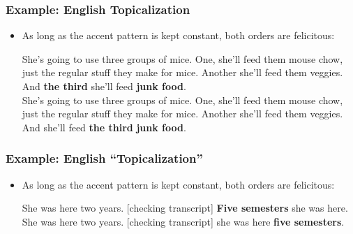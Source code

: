 \documentclass[hyperref={pdfpagelabels=false}]{beamer}
\begin{document}
\begin{frame}
\frametitle{Example: English Topicalization}
\begin{itemize}
	\item As long as the accent pattern is kept constant, both orders are felicitous:
	
	\begin{exe}
\ex \label{princetop1} She's going to use three groups of mice.
One, she'll feed them mouse chow, just the regular stuff they make for
mice.
Another she'll feed them veggies.
And \textbf{the third} she'll feed \textbf{junk food}.\\

\ex \label{untop1} She's going to use three groups of mice.
One, she'll feed them mouse chow, just the regular stuff they make for
mice.
Another she'll feed them veggies.
And she'll feed \textbf{the third} \textbf{junk food}.\\

\end{exe}

\end{itemize}
\end{frame}

\begin{frame}
\frametitle{Example: English ``Topicalization''}
\begin{itemize}
	\item As long as the accent pattern is kept constant, both orders are felicitous:
	\begin{exe}

\ex \label{princetop2} She was here two years.
[checking transcript] \textbf{Five semesters} she was here.\\

\ex \label{untop2} She was here two years.
[checking transcript] she was here \textbf{five semesters}.\\

\end{exe}

\end{itemize}
\end{frame}
\end{document}
